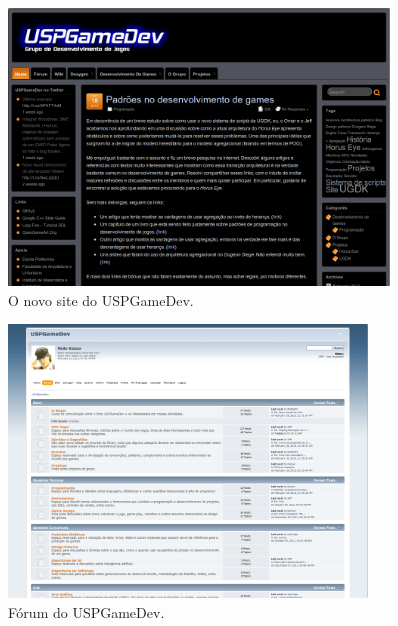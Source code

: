 \documentclass[12pt,onecolumn,a4paper]{article}
\begin{document}
        \begin{figure}[htb]
            \centering
            \includegraphics[width=0.9\textwidth]{images/site_01.png}
            \caption{O novo site do USPGameDev.}
            \label{fig:site_01}
        \end{figure}
        
        \begin{figure}[htb]
            \centering
            \includegraphics[width=0.85\textwidth]{images/site_02.png}
            \caption{Fórum do USPGameDev.}
            \label{fig:site_02}
        \end{figure}
        
\end{document}
